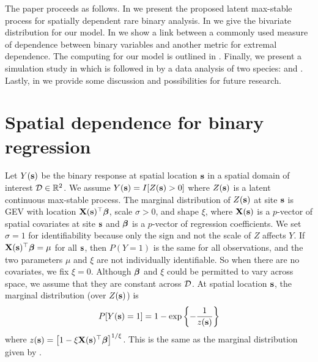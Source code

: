 The paper proceeds as follows.
In  we present the proposed latent max-stable process for spatially dependent rare binary analysis.
In  we give the bivariate distribution for our model.
In  we show a link between a commonly used measure of dependence between binary variables and another metric for extremal dependence.
The computing for our model is outlined in .
Finally, we present a simulation study in  which is followed in  by a data analysis of two species: \tamarix{} and \hedysarum{}.
Lastly, in  we provide some discussion and possibilities for future research.

\section{Spatial dependence for binary regression} \label{rbs:maxstab}

Let $Y(\mathbf{s})$ be the binary response at spatial location $\mathbf{s}$ in a spatial domain of interest ${\cal D} \in \mathbb{R}^2$.
We assume $Y(\mathbf{s}) = I[Z(\mathbf{s}) > 0]$ where $Z(\mathbf{s})$ is a latent continuous max-stable process.
The marginal distribution of $Z(\mathbf{s})$ at site $\mathbf{s}$ is GEV with location $\mathbf{X}(\mathbf{s})^\top \mbox{\boldmath $\beta$}$, scale $\sigma > 0$, and shape $\xi$, where $\mathbf{X}(\mathbf{s})$ is a $p$-vector of spatial covariates at site $\mathbf{s}$ and $\mbox{\boldmath $\beta$}$ is a $p$-vector of regression coefficients.
We set $\sigma = 1$ for identifiability because only the sign and not the scale of $Z$ affects $Y$.
If $\mathbf{X}(\mathbf{s})^\top \mbox{\boldmath $\beta$} = \mu$ for all $\mathbf{s}$, then $P(Y = 1)$ is the same for all observations, and the two parameters $\mu$ and $\xi$ are not individually identifiable.
So when there are no covariates, we fix $\xi = 0$.
Although $\mbox{\boldmath $\beta$}$ and $\xi$ could be permitted to vary across space, we assume that they are constant across ${\cal D}$.
At spatial location $\mathbf{s}$, the marginal distribution (over $Z(\mathbf{s})$) is
\begin{align}
	P[Y(\mathbf{s}) = 1] = 1 - \exp\left\{ -\displaystyle\frac{ 1 }{ z(\mathbf{s})} \right\}
\end{align}
where $z(\mathbf{s}) = \left[1 - \xi \mathbf{X}(\mathbf{s})^\top \mbox{\boldmath $\beta$}\right]^{1 / \xi}$.
This is the same as the marginal distribution given by \citet{Wang2010}.

